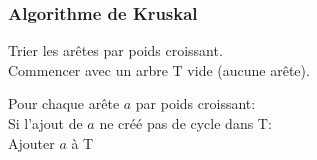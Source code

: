 \documentclass{beamer}
\begin{document}



\begin{frame}
    \frametitle{Algorithme de Kruskal}
    Trier les arêtes par poids croissant.\\
    Commencer avec un arbre T vide (aucune arête).
    \vspace{2\baselineskip}

    Pour chaque arête $a$ par poids croissant:\\
    \hspace{.5cm} Si l'ajout de $a$ ne créé pas de cycle dans T:\\
    \hspace{1cm} Ajouter $a$ à T
\end{frame}

\end{document}
